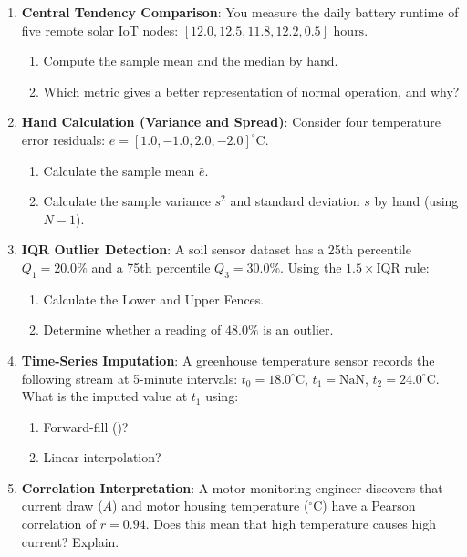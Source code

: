 \begin{enumerate}
    \item \textbf{Central Tendency Comparison}: You measure the daily battery runtime of five remote solar IoT nodes: $[12.0, 12.5, 11.8, 12.2, 0.5]\text{ hours}$.
    \begin{enumerate}
        \item Compute the sample mean and the median by hand.
        \item Which metric gives a better representation of normal operation, and why?
    \end{enumerate}

    \item \textbf{Hand Calculation (Variance and Spread)}: Consider four temperature error residuals: $e = [1.0, -1.0, 2.0, -2.0]^\circ\text{C}$.
    \begin{enumerate}
        \item Calculate the sample mean $\bar{e}$.
        \item Calculate the sample variance $s^2$ and standard deviation $s$ by hand (using $N-1$).
    \end{enumerate}

    \item \textbf{IQR Outlier Detection}: A soil sensor dataset has a 25th percentile $Q_1 = 20.0\%$ and a 75th percentile $Q_3 = 30.0\%$. Using the $1.5 \times \text{IQR}$ rule:
    \begin{enumerate}
        \item Calculate the Lower and Upper Fences.
        \item Determine whether a reading of $48.0\%$ is an outlier.
    \end{enumerate}

    \item \textbf{Time-Series Imputation}: A greenhouse temperature sensor records the following stream at 5-minute intervals: $t_0 = 18.0^\circ\text{C}$, $t_1 = \text{NaN}$, $t_2 = 24.0^\circ\text{C}$. What is the imputed value at $t_1$ using:
    \begin{enumerate}
        \item Forward-fill ()?
        \item Linear interpolation?
    \end{enumerate}

    \item \textbf{Correlation Interpretation}: A motor monitoring engineer discovers that current draw ($A$) and motor housing temperature ($^\circ\text{C}$) have a Pearson correlation of $r = 0.94$. Does this mean that high temperature causes high current? Explain.
\end{enumerate}

